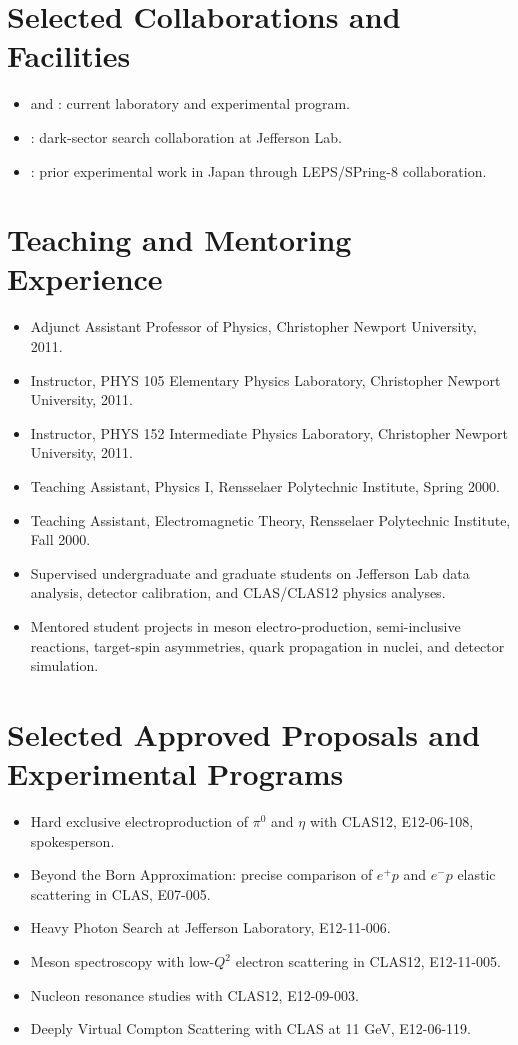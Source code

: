 \documentclass[11pt,letterpaper]{article}
\begin{document}
\section*{Selected Collaborations and Facilities}
\begin{itemize}
  \item \MauriJLab{} and \MauriHallB{}: current laboratory and experimental program.
  \item \MauriHPS{}: dark-sector search collaboration at Jefferson Lab.
  \item \MauriSPringEight{}: prior experimental work in Japan through LEPS/SPring-8 collaboration.
\end{itemize}

\section*{Teaching and Mentoring Experience}
\begin{itemize}
  \item Adjunct Assistant Professor of Physics, Christopher Newport University, 2011.
  \item Instructor, PHYS 105 Elementary Physics Laboratory, Christopher Newport University, 2011.
  \item Instructor, PHYS 152 Intermediate Physics Laboratory, Christopher Newport University, 2011.
  \item Teaching Assistant, Physics I, Rensselaer Polytechnic Institute, Spring 2000.
  \item Teaching Assistant, Electromagnetic Theory, Rensselaer Polytechnic Institute, Fall 2000.
  \item Supervised undergraduate and graduate students on Jefferson Lab data analysis, detector calibration, and CLAS/CLAS12 physics analyses.
  \item Mentored student projects in meson electro-production, semi-inclusive reactions, target-spin asymmetries, quark propagation in nuclei, and detector simulation.
\end{itemize}

\section*{Selected Approved Proposals and Experimental Programs}
\begin{itemize}
  \item Hard exclusive electroproduction of $\pi^0$ and $\eta$ with CLAS12, E12-06-108, spokesperson.
  \item Beyond the Born Approximation: precise comparison of $e^+p$ and $e^-p$ elastic scattering in CLAS, E07-005.
  \item Heavy Photon Search at Jefferson Laboratory, E12-11-006.
  \item Meson spectroscopy with low-$Q^2$ electron scattering in CLAS12, E12-11-005.
  \item Nucleon resonance studies with CLAS12, E12-09-003.
  \item Deeply Virtual Compton Scattering with CLAS at 11 GeV, E12-06-119.
\end{itemize}
\end{document}
